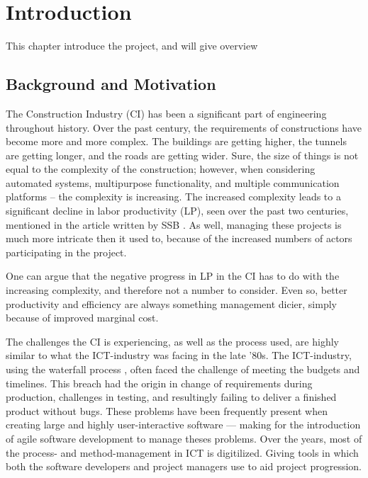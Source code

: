 \chapter{Introduction}

This chapter introduce the project, and will give overview 

\section{Background and Motivation} \label{sec:background}
The Construction Industry (CI) has been a significant part of engineering throughout history. Over the past century, the requirements of constructions have become more and more complex. The buildings are getting higher, the tunnels are getting longer, and the roads are getting wider. Sure, the size of things is not equal to the complexity of the construction; however, when considering automated systems, multipurpose functionality, and multiple communication platforms – the complexity is increasing. The increased complexity leads to a significant decline in labor productivity (LP), seen over the past two centuries, mentioned in the article written by SSB \cite{productivity}. As well, managing these projects is much more intricate then it used to, because of the increased numbers of actors participating in the project. 

One can argue that the negative progress in LP in the CI has to do with the increasing complexity, and therefore not a number to consider. Even so, better productivity and efficiency are always something management dicier, simply because of improved marginal cost.

The challenges the CI is experiencing, as well as the process used, are highly similar to what the ICT-industry was facing in the late '80s. The ICT-industry, using the waterfall process \cite{royce}, often faced the challenge of meeting the budgets and timelines. This breach had the origin in change of requirements during production, challenges in testing, and resultingly failing to deliver a finished product without bugs. These problems have been frequently present when creating large and highly user-interactive software — making for the introduction of agile software development to manage theses problems. Over the years, most of the process- and method-management in ICT is digitilized. Giving tools in which both the software developers and project managers use to aid project progression.  

